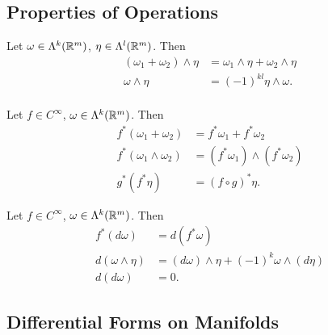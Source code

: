 \documentclass[../main.tex]{subfiles}
\begin{document}
    \subsection{Properties of Operations}
    \begin{theorem}\label{thm:exterior-product-properties}
        Let \(\omega \in \Lambda^{k}(\mathbb{R}^{m})\), \(\eta \in 
        \Lambda^{l}(\mathbb{R}^{m})\). Then
        \[
        \begin{aligned}
            (\omega_1+\omega_2)\wedge \eta &= \omega_1\wedge \eta + \omega_2 \wedge 
            \eta \\
            \omega \wedge \eta &= (-1)^{kl}\eta \wedge \omega. \\
        \end{aligned}
        \]
    \end{theorem}
    \begin{theorem}\label{thm:pullback-properties}
        Let \(f \in C^\infty\), \(\omega \in \Lambda^{k}(\mathbb{R}^{m})\). Then 
        \[
        \begin{aligned}
            f^*(\omega_1+\omega_2) &= f^*\omega_1+f^*\omega_2 \\
            f^*(\omega_1\wedge \omega_2) &= (f^*\omega_1) \wedge (f^*\omega_2) \\
            g^*(f^*\eta) &= (f\circ g)^*\eta.
        \end{aligned}
        \]
    \end{theorem}
    \begin{theorem}\label{thm:diff-properties}
        Let \(f \in C^\infty\), \(\omega \in \Lambda^{k}(\mathbb{R}^{m})\). Then
        \[
        \begin{aligned}
            f^*(d\omega) &= d(f^*\omega) \\
            d(\omega\wedge \eta) &= (d\omega)\wedge \eta + (-1)^k\omega\wedge (d\eta) \\
            d(d\omega) &= 0.
        \end{aligned}
        \]
    \end{theorem}
    \newpage
    \subsection{Differential Forms on Manifolds}
\end{document}
